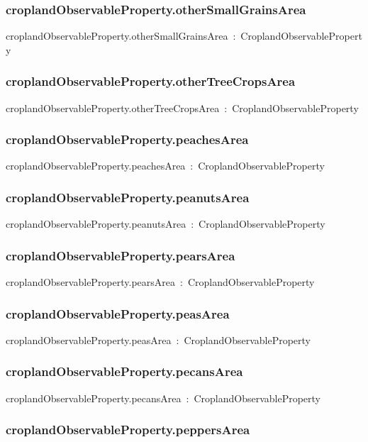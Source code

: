 \documentclass{article}
\begin{document}
\subsubsection*{croplandObservableProperty.otherSmallGrainsArea}

croplandObservableProperty.otherSmallGrainsArea~:~CroplandObservableProperty

\subsubsection*{croplandObservableProperty.otherTreeCropsArea}

croplandObservableProperty.otherTreeCropsArea~:~CroplandObservableProperty

\subsubsection*{croplandObservableProperty.peachesArea}

croplandObservableProperty.peachesArea~:~CroplandObservableProperty

\subsubsection*{croplandObservableProperty.peanutsArea}

croplandObservableProperty.peanutsArea~:~CroplandObservableProperty

\subsubsection*{croplandObservableProperty.pearsArea}

croplandObservableProperty.pearsArea~:~CroplandObservableProperty

\subsubsection*{croplandObservableProperty.peasArea}

croplandObservableProperty.peasArea~:~CroplandObservableProperty

\subsubsection*{croplandObservableProperty.pecansArea}

croplandObservableProperty.pecansArea~:~CroplandObservableProperty

\subsubsection*{croplandObservableProperty.peppersArea}
\end{document}
